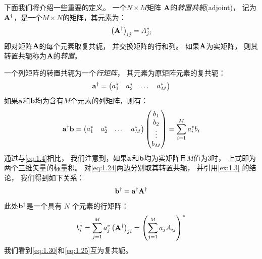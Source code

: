 下面我们将介绍一些重要的定义。
一个$N\times M$矩阵 $\mathbf A$的\emph{转置共轭}(adjoint)，
记为$\mathbf{A}^\dagger$，是一个$M \times N$的矩阵，其元素为：
\begin{equation}
 \left(\mathbf{A}^\dagger\right)_{ij} = A_{ji}^{\ast}
 \label{eq:1.26}
\end{equation}
即对矩阵$\mathbf A$的每个元素取复共轭，
并交换矩阵的行和列。
如果$\mathbf A$为实矩阵，
则其转置共轭称为$\mathbf A$的\emph{转置}。


一个列矩阵的转置共轭为一个\emph{行矩阵}，
其元素为原矩阵元素的复共轭：
\begin{equation}
 {\mbf a}^{\dagger} = 
 \begin{pmatrix*}[c]
     a_1^\ast & a_2^\ast &\dots &a_M^\ast
 \end{pmatrix*}
 \label{eq:1.27}
\end{equation}
如果${\mathbf a}$和$\mathbf b$均为含有$M$个元素的列矩阵，则有：
\begin{equation}
 {\mbf a}^{\dagger}{\mbf b} = 
 \begin{pmatrix*}[c]
     a_1^\ast & a_2^\ast &\dots &a_M^\ast
 \end{pmatrix*}
 \begin{pmatrix*}[c]
     b_1 \\ b_2 \\ \vdots \\ b_M
 \end{pmatrix*}
     = \sum_{i=1}^M a_i^{\ast} b_i
 \label{eq:1.28}
\end{equation}
通过与\autoref{eq:1.4}相比，
我们注意到，如果$\mathbf a$和$\mathbf b$均为实矩阵且$M$值为3时，
上式即为两个三维矢量的标量积。
对\autoref{eq:1.24}两边分别取其转置共轭，
并引用\autoref{ex:1.3} 的结论，
我们得到如下关系：
\begin{equation}
 {\mathbf b}^\dagger = {\mathbf a}^\dagger {\mathbf A}^\dagger
\end{equation}
此处$\mathbf b^\dagger$是一个具有 $N$ 个元素的行矩阵：
\begin{equation}
 b_i^\ast = \sum_{j=1}^M a_j^\ast \left(\mathbf A^\dagger\right)_{ji} = \left(
     \sum_{j=1}^M a_j A_{ij}
 \right)^\ast
 \label{eq:1.30}
\end{equation}
我们看到\autoref{eq:1.30}和\autoref{eq:1.25}互为复共轭。

